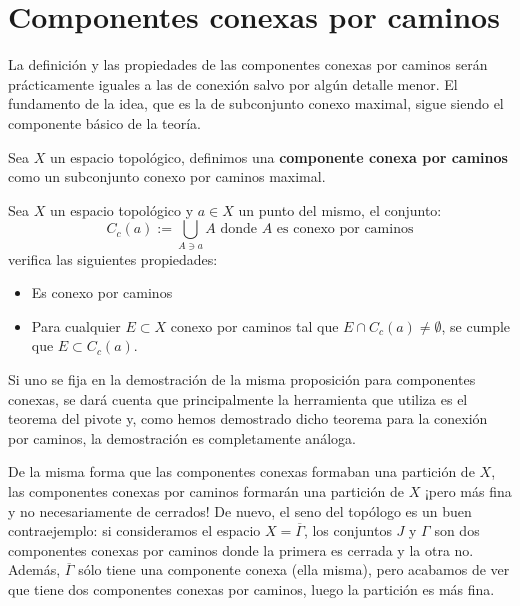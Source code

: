 \section{Componentes conexas por caminos}%
\label{sec:componentes_conexas_por_caminos}
La definición y las propiedades de las componentes conexas por caminos serán prácticamente iguales a las de conexión salvo por algún detalle menor. El fundamento de la idea, que es la de subconjunto conexo maximal, sigue siendo el componente básico de la teoría.

\begin{defi}
Sea $X$ un espacio topológico, definimos una \textbf{componente conexa por caminos} como un subconjunto conexo por caminos maximal.
\end{defi}

\begin{prop}
Sea $X$ un espacio topológico y $a\in X$ un punto del mismo, el conjunto:
\[
C_c(a) := \bigcup_{A \ni a} A \mbox{ donde }A \mbox{ es conexo por caminos}
\]
verifica las siguientes propiedades:
\begin{itemize}
\item Es conexo por caminos
\item Para cualquier $E\subset X$ conexo por caminos tal que $E\cap C_c(a) \neq \emptyset$, se cumple que $E\subset C_c(a)$.
\end{itemize}
\end{prop}
\begin{demo}
Si uno se fija en la demostración de la misma proposición para componentes conexas, se dará cuenta que principalmente la herramienta que utiliza es el teorema del pivote y, como hemos demostrado dicho teorema para la conexión por caminos, la demostración es completamente análoga.
\end{demo}

\begin{obs}
De la misma forma que las componentes conexas formaban una partición de $X$, las componentes conexas por caminos formarán una partición de $X$ ¡pero más fina y no necesariamente de cerrados! De nuevo, el seno del topólogo es un buen contraejemplo: si consideramos el espacio $X = \overline{\Gamma}$, los conjuntos $J$ y $\Gamma$ son dos componentes conexas por caminos donde la primera es cerrada y la otra no. Además, $\overline{\Gamma}$ sólo tiene una componente conexa (ella misma), pero acabamos de ver que tiene dos componentes conexas por caminos, luego la partición es más fina.
\end{obs}


